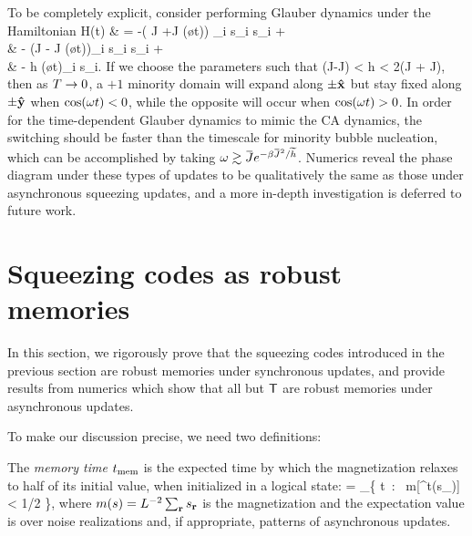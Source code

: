 \documentclass[pra,aps,twocolumn,groupedaddress,superscriptaddress,nofootinbib,preprintnumbers]{revtex4-2}
\begin{document}
	To be completely explicit, consider performing Glauber dynamics under the Hamiltonian 
	\bea \label{floquet_glauber} H(t) & = -( \ob J +\wt J \cos(\o t)) \sum_i s_i s_{i + \uvx} \\ 
	& - (\ob J - \wt J \cos(\o t))\sum_i s_i s_{i + \uvy} \\
	& - \wt h \cos(\o t)\sum_i s_i.\eea 
	If we choose the parameters such that 
	(\ob J-\wt J) < h < 2(\ob J + \wt J),\ee
	then as $T\rightarrow0$,  a $+1$ minority domain will expand along $\pm{\mathbf{\hat x}}$ but stay fixed along $\pm{\mathbf{\hat y}}$ when $\cos(\omega t)<0$, while the opposite will occur when $\cos(\omega t)>0$. In order for the time-dependent Glauber dynamics to mimic the CA dynamics, the switching should be faster than the timescale for minority bubble nucleation, which can be accomplished by taking $\o \gtrsim {\ob J} e^{-\b \ob J^2/\wt h}$. Numerics reveal the phase diagram under these types of updates to be qualitatively the same as those under asynchronous squeezing updates, and a more in-depth investigation is deferred to future work. 
	
	
	\section{Squeezing codes as robust memories} \label{sec:memories}
	
	In this section, we rigorously prove that the squeezing codes introduced in the previous section are robust memories under synchronous updates, and provide results from numerics which show that all but $\mathsf{T}$ are robust memories under asynchronous updates. 
	
	To make our discussion precise, we need two definitions: 
	
	\begin{definition}
		The {\it memory time} $t_{\rm mem}$ is the expected time by which the magnetization relaxes to half of its initial value, when initialized in a logical state: 
		\be \tmem =  \EE \min_\pm \{ t\, : \, \pm m[\mca^t(s_\pm)] < 1/2 \},\ee 
		where $m(s)= L^{-2}\sum_{\mathbf{r}} s_{\mathbf{r}}$ is the magnetization 
		and the expectation value is over noise realizations and, if appropriate, patterns of asynchronous updates. 
	\end{definition}
	
\end{document}
